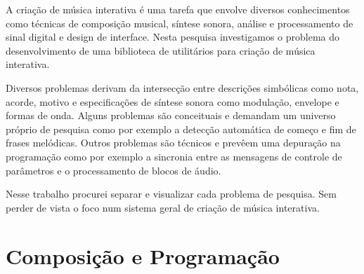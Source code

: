 \documentclass{ppgmus}
\begin{document}





A criação de música interativa é uma tarefa que envolve diversos 
conhecimentos como técnicas de composição musical, síntese sonora,
análise e processamento de sinal digital e design de interface.
Nesta pesquisa investigamos o problema do desenvolvimento de uma biblioteca
de utilitários para criação de música interativa. 


Diversos problemas derivam da intersecção entre descrições simbólicas
como nota, acorde, motivo e 
especificações de síntese sonora como modulação, envelope e formas de onda.
Alguns problemas são conceituais e demandam um universo próprio de 
pesquisa como por exemplo a detecção automática de começo e fim de
frases melódicas. Outros problemas são técnicos e prevêem uma depuração
na programação como por exemplo a sincronia entre as mensagens de controle de parâmetros
e o processamento de blocos de áudio. 

Nesse trabalho procurei separar e visualizar cada problema de pesquisa. Sem perder de vista o foco
num sistema geral de criação de música interativa.

\section{Composição e Programação}
  


\end{document}
